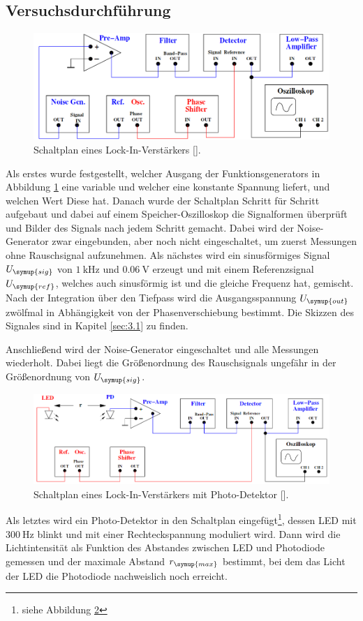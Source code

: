 \subsection{Versuchsdurchführung}
\begin{figure}
  \centering
  \includegraphics[scale=0.3]{durch.png}
  \caption{Schaltplan eines Lock-In-Verstärkers [\cite{anleitung}].}
  \label{fig:3}
\end{figure}
Als erstes wurde festgestellt, welcher Ausgang der Funktionsgenerators in Abbildung
\ref{fig:3} eine variable und welcher eine konstante Spannung liefert, und welchen
Wert Diese hat. Danach wurde der Schaltplan Schritt für Schritt aufgebaut und dabei
auf einem Speicher-Oszilloskop die Signalformen überprüft und Bilder des Signals
nach jedem Schritt gemacht. Dabei wird der Noise-Generator
zwar eingebunden, aber noch nicht eingeschaltet, um zuerst Messungen ohne Rauschsignal
aufzunehmen. Als nächstes wird ein sinusförmiges Signal $U_{\symup{sig}}$ von
$\SI{1}{\kilo\hertz}$ und $\SI{0.06}{\volt}$ erzeugt und mit einem Referenzsignal
$U_{\symup{ref}}$, welches auch sinusförmig ist und die gleiche Frequenz hat, gemischt.
Nach der Integration über den Tiefpass wird die Ausgangsspannung $U_{\symup{out}}$
zwölfmal in Abhängigkeit von der Phasenverschiebung bestimmt. Die Skizzen des Signales
sind in Kapitel \ref{sec:3.1} zu finden.

Anschließend wird der Noise-Generator eingeschaltet und alle Messungen wiederholt.
Dabei liegt die Größenordnung des Rauschsignals ungefähr in der Größenordnung
von $U_{\symup{sig}}$.

\begin{figure}
  \centering
  \includegraphics[scale=0.3]{durch2.png}
  \caption{Schaltplan eines Lock-In-Verstärkers mit Photo-Detektor [\cite{anleitung}].}
  \label{fig:4}
\end{figure}
Als letztes wird ein Photo-Detektor in den Schaltplan eingefügt\footnote{siehe Abbildung \ref{fig:4}},
dessen LED mit $\SI{300}{\hertz}$
blinkt und mit einer Rechteckspannung moduliert wird. Dann wird die Lichtintensität
als Funktion des Abstandes zwischen LED und Photodiode gemessen und der maximale
Abstand $r_{\symup{max}}$ bestimmt, bei dem das Licht der LED die Photodiode nachweislich
noch erreicht.


